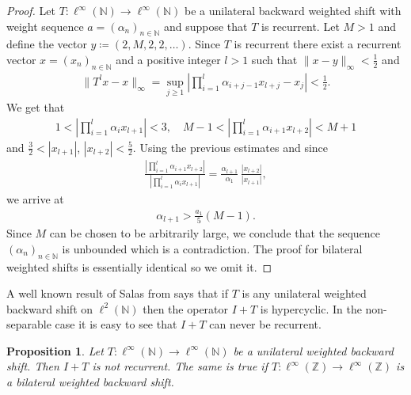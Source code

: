 \documentclass[12pt,leqno]{amsart}
\theoremstyle{plain}
\newtheorem{proposition}[equation]{Proposition}
\theoremstyle{definition}
\numberwithin{equation}{section}
\begin{document}
\begin{proof}
	Let $T:\ell^{\infty}(\mathbb N )\to \ell^\infty (\mathbb{N})$ be a unilateral backward weighted shift with weight sequence $a = (\alpha_n)_{n\in\mathbb N }$ and suppose that $T$ is recurrent. Let $M>1$ and define the vector $y\coloneqq(2,M,2,2,\ldots )$. Since $T$ is recurrent there exist a recurrent vector $x=(x_n)_{n\in\mathbb{N}}$ and a positive integer $l>1$ such that $\| x-y\|_{\infty}<\frac{1}{2}$ and
	\begin{align*}
		\| T^lx-x\|_{\infty}=\displaystyle{\sup_{j\geq 1} \left | \prod_{i=1}^{l}\alpha_{i+j-1}x_{l+j}-x_j\right | <\frac{1}{2}}.
	\end{align*}
	We get that
	\begin{align*}
		1<\displaystyle{\left | \prod_{i=1}^{l}\alpha_{i}x_{l+1}\right | <3}, \quad M-1<\displaystyle{\left | \prod_{i=1}^{l}\alpha_{i+1}x_{l+2}\right |}<M+1 
	\end{align*}
	and $\frac{3}{2}<|x_{l+1}|$, $|x_{l+2}|<\frac{5}{2}$. Using the previous estimates and since 
	\begin{align*}
		\frac{\displaystyle{\left | \prod_{i=1}^{l}\alpha_{i+1}x_{l+2}\right |}}{\displaystyle{\left | \prod_{i=1}^{l}\alpha_{i}x_{l+1}\right |}}=\frac{\alpha_{l+1}}{\alpha_1}\,\frac{|x_{l+2}|}{|x_{l+1}|}, 
	\end{align*}
	we arrive at 
	\begin{align*}
		\alpha_{l+1}>\frac{a_1}{5} (M-1). 
	\end{align*}
	Since $M$ can be chosen to be arbitrarily large, we conclude that the sequence $ (\alpha_n)_{n\in\mathbb{N}}$ is unbounded which is a contradiction. The proof for bilateral weighted shifts is essentially identical so we omit it. 
\end{proof}
A well known result of Salas from \cite{Salas} says that if $T$ is any unilateral weighted backward shift on $\ell^2(\mathbb N)$ then the operator $I+T$ is hypercyclic. In the non-separable case it is easy to see that $I+T$ can never be recurrent.

\begin{proposition}
	Let $T:\ell^\infty(\mathbb N)\to \ell^\infty(\mathbb N)$ be a unilateral weighted backward shift. Then $I+T$ is not recurrent. The same is true if $T:\ell^\infty(\mathbb Z)\to \ell^\infty(\mathbb Z)$ is a bilateral weighted backward shift. 
\end{proposition}
\end{document}
